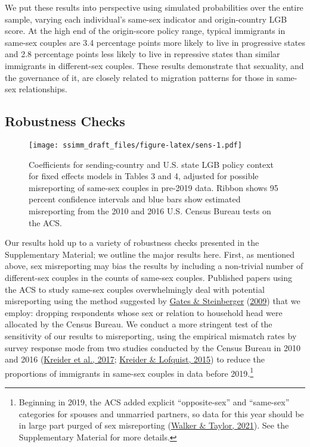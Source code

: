 \documentclass[
  11pt,
]{article}
\begin{document}
We put these results into perspective using simulated probabilities over the entire sample, varying each individual's same-sex indicator and origin-country LGB score. At the high end of the origin-score policy range, typical immigrants in same-sex couples are 3.4 percentage points more likely to live in progressive states and 2.8 percentage points less likely to live in repressive states than similar immigrants in different-sex couples. These results demonstrate that sexuality, and the governance of it, are closely related to migration patterns for those in same-sex relationships.

\hypertarget{robustness-checks}{%
\subsection{Robustness Checks}\label{robustness-checks}}

\begin{figure}
\centering
\texttt{[image: ssimm\_draft\_files/figure-latex/sens-1.pdf]}
\caption{\label{fig:sens}Coefficients for sending-country and U.S. state LGB policy context for fixed effects models in Tables 3 and 4, adjusted for possible misreporting of same-sex couples in pre-2019 data. Ribbon shows 95 percent confidence intervals and blue bars show estimated misreporting from the 2010 and 2016 U.S. Census Bureau tests on the ACS.}
\end{figure}

Our results hold up to a variety of robustness checks presented in the Supplementary Material; we outline the major results here. First, as mentioned above, sex misreporting may bias the results by including a non-trivial number of different-sex couples in the counts of same-sex couples. Published papers using the ACS to study same-sex couples overwhelmingly deal with potential misreporting using the method suggested by \protect\hyperlink{ref-gates_2009}{Gates \& Steinberger} (\protect\hyperlink{ref-gates_2009}{2009}) that we employ: dropping respondents whose sex or relation to household head were allocated by the Census Bureau. We conduct a more stringent test of the sensitivity of our results to misreporting, using the empirical mismatch rates by survey response mode from two studies conducted by the Census Bureau in 2010 and 2016 (\protect\hyperlink{ref-kreider_2017}{Kreider et al., 2017}; \protect\hyperlink{ref-kreider_2015}{Kreider \& Lofquist, 2015}) to reduce the proportions of immigrants in same-sex couples in data before 2019.\footnote{Beginning in 2019, the ACS added explicit ``opposite-sex'' and ``same-sex'' categories for spouses and unmarried partners, so data for this year should be in large part purged of sex misreporting (\protect\hyperlink{ref-walker_2021}{Walker \& Taylor, 2021}). See the Supplementary Material for more details.}
\end{document}
